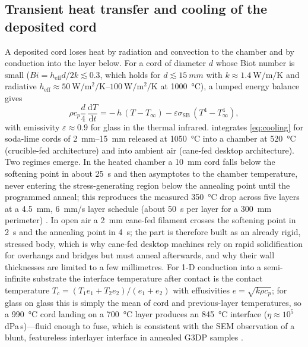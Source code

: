 \subsection{Transient heat transfer and cooling of the deposited cord}
A deposited cord loses heat by radiation and convection to the chamber and by conduction into the layer below. For a cord of diameter \(d\) whose Biot number is small (\(Bi = h_{\mathrm{eff}} d / 2k \lesssim 0.3\), which holds for \(d \lesssim \SI{15}{mm}\) with \(k \approx \SI{1.4}{\watt\per\metre\per\kelvin}\) and radiative \(h_{\mathrm{eff}} \approx \SIrange{50}{100}{\watt\per\square\metre\per\kelvin}\) at \SI{1000}{\celsius}), a lumped energy balance gives
\begin{equation}
  \rho c_p \frac{d}{4}\,\frac{\mathrm{d}T}{\mathrm{d}t} = -\,h\,(T - T_\infty) - \varepsilon\sigma_{\mathrm{SB}}\,(T^{4} - T_\infty^{4}),
  \label{eq:cooling}
\end{equation}
with emissivity \(\varepsilon \approx 0.9\) for glass in the thermal infrared.  integrates \cref{eq:cooling} for soda-lime cords of \SIrange{2}{15}{mm} released at \SI{1050}{\celsius} into a chamber at \SI{520}{\celsius} (crucible-fed architecture) and into ambient air (cane-fed desktop architecture). Two regimes emerge. In the heated chamber a \SI{10}{mm} cord falls below the softening point in about \SI{25}{s} and then asymptotes to the chamber temperature, never entering the stress-generating region below the annealing point until the programmed anneal; this reproduces the measured \SI{350}{\celsius} drop across five layers at a \SI{4.5}{mm}, \SI{6}{mm/s} layer schedule (about \SI{50}{s} per layer for a \SI{300}{mm} perimeter) \citep{klein2015}. In open air a \SI{2}{mm} cane-fed filament crosses the softening point in \SI{2}{s} and the annealing point in \SI{4}{s}; the part is therefore built as an already rigid, stressed body, which is why cane-fed desktop machines rely on rapid solidification for overhangs and bridges \citep{maple_ammedia} but must anneal afterwards, and why their wall thicknesses are limited to a few millimetres. For 1-D conduction into a semi-infinite substrate the interface temperature after contact is the contact temperature \(T_c = (T_1 e_1 + T_2 e_2)/(e_1 + e_2)\) with effusivities \(e = \sqrt{k\rho c_p}\); for glass on glass this is simply the mean of cord and previous-layer temperatures, so a \SI{990}{\celsius} cord landing on a \SI{700}{\celsius} layer produces an \SI{845}{\celsius} interface (\(\eta \approx 10^{5}\)\,dPa\,s)---fluid enough to fuse, which is consistent with the SEM observation of a blunt, featureless interlayer interface in annealed G3DP samples \citep{klein2015}.

